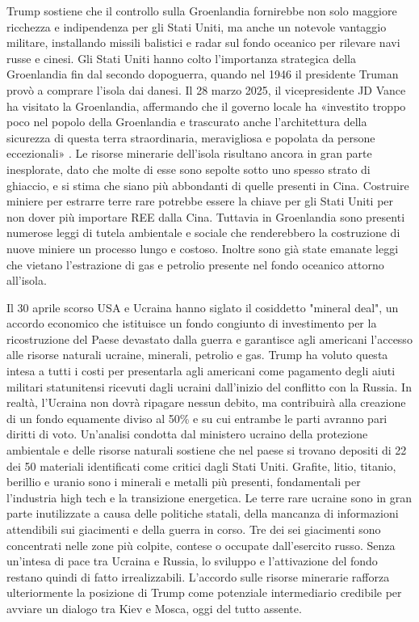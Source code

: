 \documentclass[12pt,a4paper,oneside]{book}
\begin{document}
Trump sostiene che il controllo sulla Groenlandia fornirebbe non solo maggiore ricchezza e indipendenza per gli Stati Uniti, ma anche un notevole vantaggio militare, installando missili balistici e radar sul fondo oceanico per rilevare navi russe e cinesi.
Gli Stati Uniti hanno colto l'importanza strategica della Groenlandia fin dal secondo dopoguerra, quando nel 1946 il presidente Truman provò a comprare l'isola dai danesi. Il 28 marzo 2025, il vicepresidente JD Vance ha visitato la Groenlandia, affermando che il governo locale ha «investito troppo poco nel popolo della Groenlandia e trascurato anche l'architettura della sicurezza di questa terra straordinaria, meravigliosa e popolata da persone eccezionali» \cite{foxnews2024greenland}. 
Le risorse minerarie dell'isola risultano ancora in gran parte inesplorate, dato che molte di esse sono sepolte sotto uno spesso strato di ghiaccio, e si stima che siano più abbondanti di quelle presenti in Cina. Costruire miniere per estrarre terre rare potrebbe essere la chiave per gli Stati Uniti per non dover più importare REE dalla Cina.
Tuttavia in Groenlandia sono presenti numerose leggi di tutela ambientale e sociale che renderebbero la costruzione di nuove miniere un processo lungo e costoso. Inoltre sono già state emanate leggi che vietano l'estrazione di gas e petrolio presente nel fondo oceanico attorno all'isola.

Il 30 aprile scorso USA e Ucraina hanno siglato il cosiddetto "mineral deal", un accordo economico che istituisce un fondo congiunto di investimento per la ricostruzione del Paese devastato dalla guerra e garantisce agli americani l'accesso alle risorse naturali ucraine, minerali, petrolio e gas. Trump ha voluto questa intesa a tutti i costi per presentarla agli americani come pagamento degli aiuti militari statunitensi ricevuti dagli ucraini dall'inizio del conflitto con la Russia. In realtà, l'Ucraina non dovrà ripagare nessun debito, ma contribuirà alla creazione di un fondo equamente diviso al 50\% e su cui entrambe le parti avranno pari diritti di voto.
Un'analisi condotta dal ministero ucraino della protezione ambientale e delle risorse naturali sostiene che nel paese si trovano depositi di 22 dei 50 materiali identificati come critici dagli Stati Uniti. Grafite, litio, titanio, berillio e uranio sono i minerali e metalli più presenti, fondamentali per l'industria high tech e la transizione energetica. Le terre rare ucraine sono in gran parte inutilizzate a causa delle politiche statali, della mancanza di informazioni attendibili sui giacimenti e della guerra in corso. Tre dei sei giacimenti sono concentrati nelle zone più colpite, contese o occupate dall'esercito russo.
Senza un'intesa di pace tra Ucraina e Russia, lo sviluppo e l'attivazione del fondo restano quindi di fatto irrealizzabili. L'accordo sulle risorse minerarie rafforza ulteriormente la posizione di Trump come potenziale intermediario credibile per avviare un dialogo tra Kiev e Mosca, oggi del tutto assente.
\end{document}
